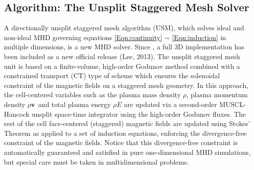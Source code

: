 \subsection{Algorithm: The Unsplit Staggered Mesh Solver}
\label{Sec:usm_algorithm}
A directionally unsplit staggered mesh algorithm (USM), which solves
ideal and non-ideal MHD governing equations
\eqref{Eqn:continuity} $\sim$ \eqref{Eqn:induction} in
multiple dimensions, is a new MHD solver. Since \flashx, a full 3D implementation
has been included as a new official release  (Lee, 2013).
The unsplit staggered mesh unit is based on a finite-volume, high-order
Godunov method combined with a constrained transport (CT) type
of scheme which ensures the solenoidal constraint of the magnetic fields
on a staggered mesh geometry.
In this approach, the cell-centered variables such as the
plasma mass density  $\rho$, plasma momentum density $\rho\textbf{v}$
and total plasma energy $\rho E$ are updated via a second-order
MUSCL-Hancock unsplit space-time integrator using the high-order Godunov fluxes.
The rest of the cell face-centered (staggered) magnetic fields are updated
using Stokes' Theorem as applied to a set of induction equations,
enforcing the divergence-free constraint of the magnetic fields.
Notice that this divergence-free constraint is automatically
guaranteed and satisfied in pure one-dimensional MHD simulations,
but special care must be taken in multidimensional problems.

